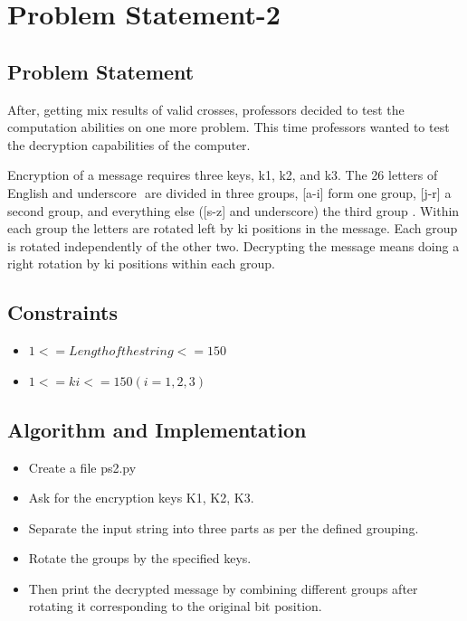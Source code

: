 \documentclass[12pt]{article}
\begin{document}
	\section{Problem Statement-2}
	
		\subsection{Problem Statement}
		After, getting mix results of valid crosses, professors decided to test the computation abilities
		on one more problem. This time professors wanted to test the decryption capabilities of the
		computer.
		
		Encryption of a message requires three keys, k1, k2, and k3. The ​26 letters of English and
		underscore ​ are divided in three groups, ​[a-i] form one group, [j-r] a second group, and
		everything else ([s-z] and underscore) the third group ​. Within each group the letters are
		rotated left by ki positions in the message. Each group is rotated independently of the other
		two. Decrypting the message means doing a right rotation by ki positions within each group.
			\begin{figure}[h!]
				\centering
			\end{figure}
			
		\subsection{Constraints}
		
			\begin{itemize}
				\item $1 <= Length of the string <=150$
				\item $1<= ki <=150 (i=1,2,3)$
			\end{itemize}
		
		\subsection{Algorithm and Implementation~\cite{}}
		
			\begin{itemize}
			\item Create a file ps2.py
			\item Ask for the encryption keys K1, K2, K3.
			\item Separate the input string into three parts as per the defined grouping.
			\item Rotate the groups by the specified keys.
			\item Then print the decrypted message by combining different groups after rotating it corresponding to the original bit position.  
			\end{itemize}
		
\end{document}
